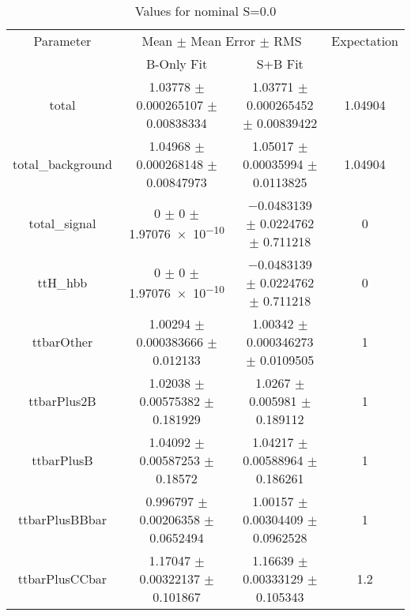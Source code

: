 \begin{table}
\centering
\caption{Values for nominal S=0.0}
\begin{tabular}{cccc}
\toprule
Parameter & \multicolumn{2}{c}{Mean $\pm$ Mean Error $\pm$ RMS} & Expectation\\
 & B-Only Fit & S+B Fit & \\
\midrule
total & \num{1.03778} $\pm$ \num{0.000265107} $\pm$ \num{0.00838334} & \num{1.03771} $\pm$ \num{0.000265452} $\pm$ \num{0.00839422} & \num{1.04904}\\
total\_background & \num{1.04968} $\pm$ \num{0.000268148} $\pm$ \num{0.00847973} & \num{1.05017} $\pm$ \num{0.00035994} $\pm$ \num{0.0113825} & \num{1.04904}\\
total\_signal & \num{0} $\pm$ \num{0} $\pm$ \num{1.97076e-10} & \num{-0.0483139} $\pm$ \num{0.0224762} $\pm$ \num{0.711218} & \num{0}\\
ttH\_hbb & \num{0} $\pm$ \num{0} $\pm$ \num{1.97076e-10} & \num{-0.0483139} $\pm$ \num{0.0224762} $\pm$ \num{0.711218} & \num{0}\\
ttbarOther & \num{1.00294} $\pm$ \num{0.000383666} $\pm$ \num{0.012133} & \num{1.00342} $\pm$ \num{0.000346273} $\pm$ \num{0.0109505} & \num{1}\\
ttbarPlus2B & \num{1.02038} $\pm$ \num{0.00575382} $\pm$ \num{0.181929} & \num{1.0267} $\pm$ \num{0.005981} $\pm$ \num{0.189112} & \num{1}\\
ttbarPlusB & \num{1.04092} $\pm$ \num{0.00587253} $\pm$ \num{0.18572} & \num{1.04217} $\pm$ \num{0.00588964} $\pm$ \num{0.186261} & \num{1}\\
ttbarPlusBBbar & \num{0.996797} $\pm$ \num{0.00206358} $\pm$ \num{0.0652494} & \num{1.00157} $\pm$ \num{0.00304409} $\pm$ \num{0.0962528} & \num{1}\\
ttbarPlusCCbar & \num{1.17047} $\pm$ \num{0.00322137} $\pm$ \num{0.101867} & \num{1.16639} $\pm$ \num{0.00333129} $\pm$ \num{0.105343} & \num{1.2}\\
\bottomrule
\end{tabular}
\end{table}